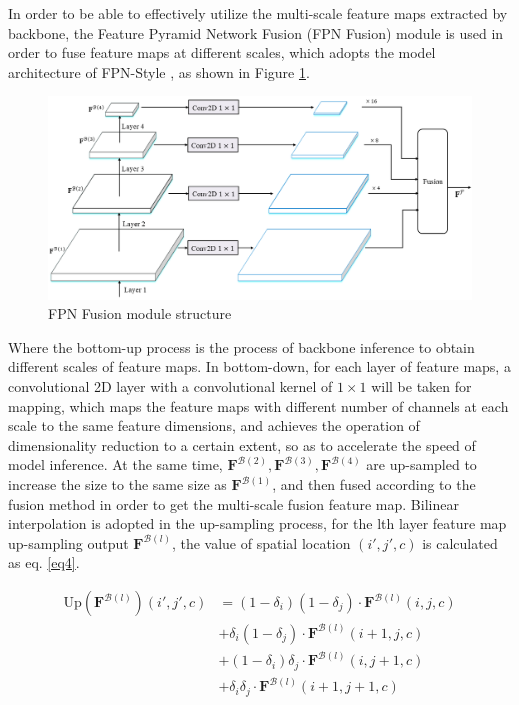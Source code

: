 In order to be able to effectively utilize the multi-scale feature maps extracted by backbone, the Feature Pyramid Network Fusion (FPN Fusion) module is used in order to fuse feature maps at different scales, which adopts the model architecture of FPN-Style \cite{23}, as shown in Figure \ref{fig:fpn}.

\begin{figure}[htbp]
  \begin{center}
      \includegraphics[scale=0.45]{figure/fpn.png}
  \end{center}
  \caption{FPN Fusion module structure}
  \label{fig:fpn}
\end{figure}

Where the bottom-up process is the process of backbone inference to obtain different scales of feature maps. In bottom-down, for each layer of feature maps, a convolutional 2D layer with a convolutional kernel of $1\times 1$ will be taken for mapping, which maps the feature maps with different number of channels at each scale to the same feature dimensions, and achieves the operation of dimensionality reduction to a certain extent, so as to accelerate the speed of model inference. At the same time, $\mathbf{F}^{\mathcal{B}(2)} ,\mathbf{F}^{\mathcal{B}(3)} ,\mathbf{F}^{\mathcal{B}(4)}$ are up-sampled to increase the size to the same size as $\mathbf{F}^{\mathcal{B}(1)}$, and then fused according to the fusion method in order to get the multi-scale fusion feature map. Bilinear interpolation \cite{18} is adopted in the up-sampling process, for the lth layer feature map up-sampling output $\mathbf{F}^{\mathcal{B}(l)}$, the value of spatial location $(i',j',c)$ is calculated as eq. \ref{eq4}.

\begin{equation}
\label{eq4}
  \begin{aligned}
    \mbox{Up}(\mathbf{F}^{\mathcal{B}(l)})(i', j', c) &= (1-\delta_i)(1-\delta_j)\cdot \mathbf{F}^{\mathcal{B}(l)}(i, j, c)\\
    &+\delta_i(1-\delta_j)\cdot \mathbf{F}^{\mathcal{B}(l)}(i+1, j, c) \\
    &+(1-\delta_i)\delta_j\cdot \mathbf{F}^{\mathcal{B}(l)}(i, j+1, c) \\
    &+\delta_i \delta_j \cdot \mathbf{F}^{\mathcal{B}(l)}(i+1, j+1, c)
  \end{aligned}
\end{equation}

